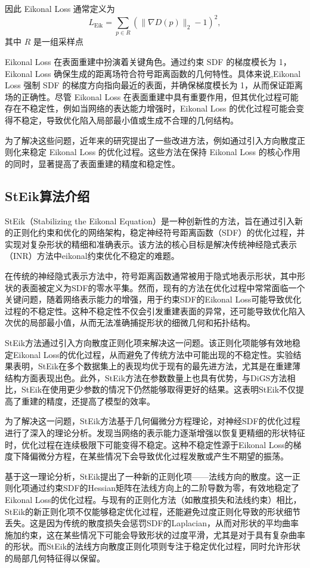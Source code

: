 \documentclass{xduugthesis}
\begin{document}
因此 Eikonal Loss 通常定义为
\begin{equation}
L_{\text{Eik}} = \sum_{p \in R} \left( \|\nabla D(p)\|_2 - 1 \right)^2,
\end{equation}
其中 \( R \) 是一组采样点

Eikonal Loss 在表面重建中扮演着关键角色。通过约束 SDF 的梯度模长为 1，Eikonal Loss 确保生成的距离场符合符号距离函数的几何特性。具体来说,Eikonal Loss 强制 SDF 的梯度方向指向最近的表面，并确保梯度模长为 1，从而保证距离场的正确性。尽管 Eikonal Loss 在表面重建中具有重要作用，但其优化过程可能存在不稳定性，例如当网络的表达能力增强时，Eikonal Loss 的优化过程可能会变得不稳定，导致优化陷入局部最小值或生成不合理的几何结构。

为了解决这些问题，近年来的研究提出了一些改进方法，例如通过引入方向散度正则化来稳定 Eikonal Loss 的优化过程。这些方法在保持 Eikonal Loss 的核心作用的同时，显著提高了表面重建的精度和稳定性。
\subsection{StEik算法介绍}
StEik（Stabilizing the Eikonal Equation）是一种创新性的方法，旨在通过引入新的正则化约束和优化的网络架构，稳定神经符号距离函数（SDF）的优化过程，并实现对复杂形状的精细和准确表示。该方法的核心目标是解决传统神经隐式表示（INR）方法中eikonal约束优化不稳定的难题。

在传统的神经隐式表示方法中，符号距离函数通常被用于隐式地表示形状，其中形状的表面被定义为SDF的零水平集。然而，现有的方法在优化过程中常常面临一个关键问题，随着网络表示能力的增强，用于约束SDF的Eikonal Loss可能导致优化过程的不稳定性。这种不稳定性不仅会引发重建表面的异常，还可能导致优化陷入次优的局部最小值，从而无法准确捕捉形状的细微几何和拓扑结构。

StEik方法通过引入方向散度正则化项来解决这一问题。该正则化项能够有效地稳定Eikonal Loss的优化过程，从而避免了传统方法中可能出现的不稳定性。实验结果表明，StEik在多个数据集上的表现均优于现有的最先进方法，尤其是在重建薄结构方面表现出色。此外，StEik方法在参数数量上也具有优势，与DiGS方法相比，StEik在使用更少参数的情况下仍然能够取得更好的结果。这表明StEik不仅提高了重建的精度，还提高了模型的效率。

为了解决这一问题，StEik方法基于几何偏微分方程理论，对神经SDF的优化过程进行了深入的理论分析。发现当网络的表示能力逐渐增强以恢复更精细的形状特征时，优化过程在连续极限下可能变得不稳定。这种不稳定性源于Eikonal Loss的梯度下降偏微分方程，在某些情况下会导致优化过程发散或产生不期望的振荡。

基于这一理论分析，StEik提出了一种新的正则化项——法线方向的散度。这一正则化项通过约束SDF的Hessian矩阵在法线方向上的二阶导数为零，有效地稳定了Eikonal Loss的优化过程。与现有的正则化方法（如散度损失和法线约束）相比，StEik的新正则化项不仅能够稳定优化过程，还能避免过度正则化导致的形状细节丢失。这是因为传统的散度损失会惩罚SDF的Laplacian，从而对形状的平均曲率施加约束，这在某些情况下可能会导致形状的过度平滑，尤其是对于具有复杂曲率的形状。而StEik的法线方向散度正则化项则专注于稳定优化过程，同时允许形状的局部几何特征得以保留。
\end{document}
